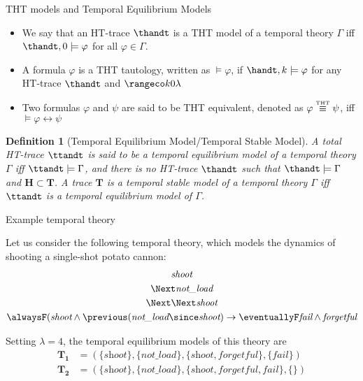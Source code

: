 \documentclass[aspectratio=169,xcolor=svgnames]{beamer}
\theoremstyle{theoremstyle_space}
\newtheorem{definition}{Definition}
\begin{document}
\begin{frame}[t]{THT models and Temporal Equilibrium Models}

  \begin{itemize}
  \item We say that an HT-trace $\thandt$ is a THT model of a temporal
    theory $\Gamma$ iff $\thandt,0 \models \varphi$ for all
    $\varphi \in \Gamma$.
  \item A formula $\varphi$ is a THT tautology, written as
    $\models \varphi$, if $\handt,k \models \varphi$ for any HT-trace
    $\thandt$ and $\kinlambda$
  \item Two formulas $\varphi$ and $\psi$ are said to be THT
    equivalent, denoted as $\varphi \stackrel{\normalfont\mbox{\tiny THT}}{\equiv} \psi$, iff
    $\models \varphi \leftrightarrow \psi$
  \end{itemize}

\begin{definition}[Temporal Equilibrium Model/Temporal Stable Model]
  A total HT-trace $\ttandt$ is said to be a temporal equilibrium
  model of a temporal theory $\Gamma$ iff $\ttandt \models \Gamma$,
  and there is no HT-trace $\thandt$ such that
  $\thandt \models \Gamma$ and $\bm{H} \subset \bm{T}$. A trace
  $\bm{T}$ is a temporal stable model of a temporal theory $\Gamma$
  iff $\ttandt$ is a temporal equilibrium model of $\Gamma$.
\end{definition}

\end{frame}

\begin{frame}[t]{Example temporal theory}
\begin{example}\label{exam:shoot-ground-theory}
  Let us consider the following temporal theory, which models the
  dynamics of shooting a single-shot potato cannon:
\begin{equation*}
\begin{gathered}
\textit{shoot}\\
\Next\textit{not\_load}\\
\Next\Next\textit{shoot}\\
\alwaysF(\textit{shoot} \wedge \previous(\textit{not\_load} \since \textit{shoot})
\rightarrow \eventuallyF \textit{fail} \wedge \textit{forgetful}
\end{gathered}
\end{equation*}

Setting $\lambda=4$, the temporal equilibrium models of this theory
are
\begin{align*}
\bm{T_1}&=(\{\textit{shoot}\}, \{\textit{not\_load}\},
\{\textit{shoot}, \textit{forgetful}\}, \{ \textit{fail} \})\\
\bm{T_2}&=(\{\textit{shoot}\}, \{\textit{not\_load}\},
\{\textit{shoot}, \textit{forgetful}, \textit{fail}\}, \{ \})
\end{align*}

\end{example}
\end{frame}
\end{document}
